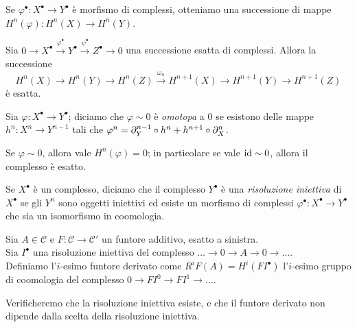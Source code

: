 \begin{proposition}
    Se $\varphi^\bullet:X^\bullet\to Y^\bullet$ è morfismo di complessi, otteniamo una successione di mappe $H^n(\varphi):H^n(X)\to H^n(Y)$.
\end{proposition}

\begin{theorem}
    Sia $0\rightarrow X^\bullet\xrightarrow{\varphi^\bullet} Y^\bullet \xrightarrow{\psi^\bullet} Z^\bullet\rightarrow 0$ una successione esatta di complessi. Allora la successione $$H^n(X)\to H^n(Y)\to H^n(Z)\xrightarrow{\omega_n} H^{n+1}(X)\to H^{n+1}(Y)\to H^{n+1}(Z)$$
    è esatta.
\end{theorem}

\begin{definition}
    Sia $\varphi: X^\bullet\to Y^\bullet$; diciamo che $\varphi\sim0$ è \emph{omotopa} a $0$ se esistono delle mappe $h^n: X^n\to Y^{n-1}$ tali che $\varphi^n=\partial_Y^{n-1}\circ h^n + h^{n+1}\circ\partial_X^n$.
\end{definition}

\begin{proposition}
    Se $\varphi\sim0$, allora vale $H^n(\varphi)=0$; in particolare se vale $\operatorname{id}\sim0$, allora il complesso è esatto.
\end{proposition}

\begin{definition}
    Se $X^\bullet$ è un complesso, diciamo che il complesso $Y^\bullet$ è una \emph{risoluzione iniettiva} di $X^\bullet$ se gli $Y^n$ sono oggetti iniettivi ed esiste un morfismo di complessi $\varphi^\bullet:X^\bullet\to Y^\bullet$ che sia un isomorfismo in coomologia.
\end{definition}

\begin{definition}
    Sia $A\in\mathcal C$ e $F:\mathcal C\to\mathcal C'$ un funtore additivo, esatto a sinistra.\\
    Sia $I^\bullet$ una risoluzione iniettiva del complesso $\dots\to0\to A\to0\to\dots$.\\
    Definiamo l'$i$-esimo funtore derivato come $R^iF(A)=H^i(FI^\bullet)$ l'$i$-esimo gruppo di coomologia del complesso $0\to FI^0\to FI^1\to\dots$.
\end{definition}
\begin{oss}
    Verificheremo che la risoluzione iniettiva esiste, e che il funtore derivato non dipende dalla scelta della risoluzione iniettiva.
\end{oss}


